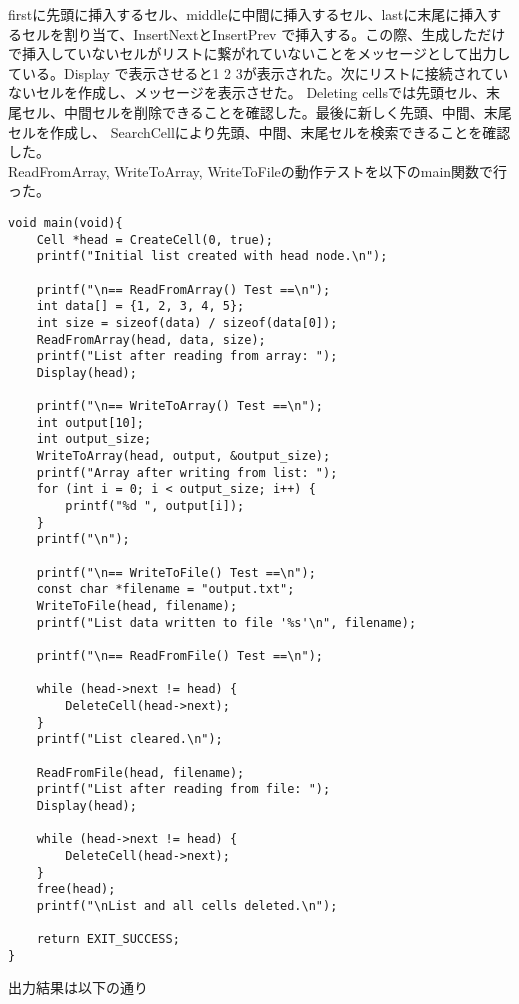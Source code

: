 \documentclass{ltjsarticle}
\begin{document}
firstに先頭に挿入するセル、middleに中間に挿入するセル、lastに末尾に挿入するセルを割り当て、InsertNextとInsertPrev
で挿入する。この際、生成しただけで挿入していないセルがリストに繋がれていないことをメッセージとして出力している。Display
で表示させると1 2 3が表示された。次にリストに接続されていないセルを作成し、メッセージを表示させた。
Deleting cellsでは先頭セル、末尾セル、中間セルを削除できることを確認した。最後に新しく先頭、中間、末尾セルを作成し、
SearchCellにより先頭、中間、末尾セルを検索できることを確認した。\\ \indent
ReadFromArray, WriteToArray, WriteToFileの動作テストを以下のmain関数で行った。
\begin{lstlisting}
void main(void){
    Cell *head = CreateCell(0, true);
    printf("Initial list created with head node.\n");
   
    printf("\n== ReadFromArray() Test ==\n");
    int data[] = {1, 2, 3, 4, 5};
    int size = sizeof(data) / sizeof(data[0]);
    ReadFromArray(head, data, size);
    printf("List after reading from array: ");
    Display(head);

    printf("\n== WriteToArray() Test ==\n");
    int output[10]; 
    int output_size;
    WriteToArray(head, output, &output_size);
    printf("Array after writing from list: ");
    for (int i = 0; i < output_size; i++) {
        printf("%d ", output[i]);
    }
    printf("\n");

    printf("\n== WriteToFile() Test ==\n");
    const char *filename = "output.txt";
    WriteToFile(head, filename);
    printf("List data written to file '%s'\n", filename);

    printf("\n== ReadFromFile() Test ==\n");
  
    while (head->next != head) {
        DeleteCell(head->next);
    }
    printf("List cleared.\n");

    ReadFromFile(head, filename);
    printf("List after reading from file: ");
    Display(head);
    
    while (head->next != head) {
        DeleteCell(head->next);
    }
    free(head);
    printf("\nList and all cells deleted.\n");

    return EXIT_SUCCESS;  
} 
\end{lstlisting}
出力結果は以下の通り
\end{document}
